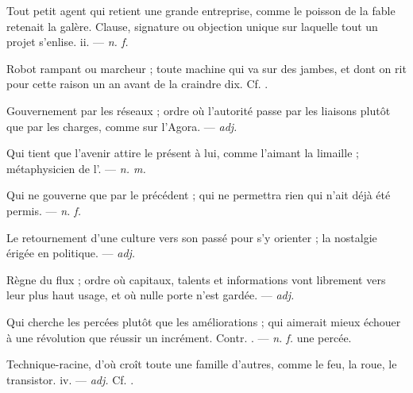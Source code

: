   Tout petit agent qui retient une grande entreprise, comme le poisson de la fable retenait la galère.   Clause, signature ou objection unique sur laquelle tout un projet s'enlise.   ii. ---  \textit{n. f.}

 Robot rampant ou marcheur ; toute machine qui va sur des jambes, et dont on rit pour cette raison un an avant de la craindre dix. Cf. .

 Gouvernement par les réseaux ; ordre où l'autorité passe par les liaisons plutôt que par les charges, comme sur l'Agora. ---  \textit{adj.}

 Qui tient que l'avenir attire le présent à lui, comme l'aimant la limaille ; métaphysicien de l'. ---  \textit{n. m.}

 Qui ne gouverne que par le précédent ; qui ne permettra rien qui n'ait déjà été permis. ---  \textit{n. f.}

 Le retournement d'une culture vers son passé pour s'y orienter ; la nostalgie érigée en politique. ---  \textit{adj.}

 Règne du flux ; ordre où capitaux, talents et informations vont librement vers leur plus haut usage, et où nulle porte n'est gardée. ---  \textit{adj.}

 Qui cherche les percées plutôt que les améliorations ; qui aimerait mieux échouer à une révolution que réussir un incrément. Contr. . ---  \textit{n. f.} une percée.

 Technique-racine, d'où croît toute une famille d'autres, comme le feu, la roue, le transistor.   iv. ---  \textit{adj.} Cf. .

